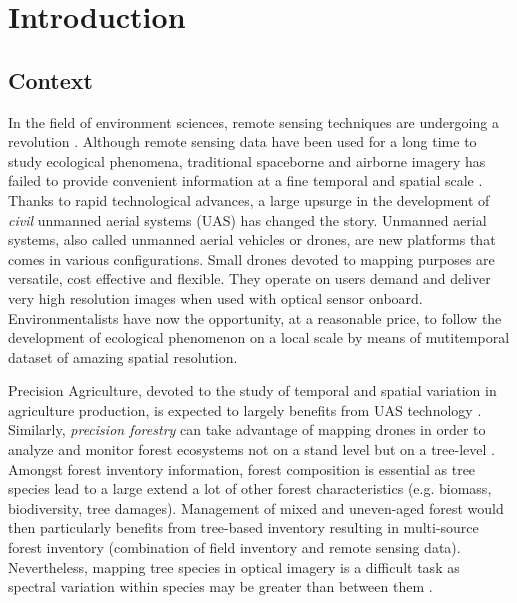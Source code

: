 \documentclass[remotesensing,article,submit,moreauthors,pdftex,12pt,a4paper]{mdpi} %
\begin{document}
\section{Introduction}

\subsection{Context}

In the field of environment sciences, remote sensing techniques are undergoing a revolution \cite{anderson_lightweight_2013}. 
Although remote sensing data have been used for a long time to study ecological phenomena, traditional spaceborne and airborne imagery has failed to provide convenient information at a fine temporal and spatial scale \cite{anderson_lightweight_2013}. 
Thanks to rapid technological advances, a large upsurge in the development of \textit{civil} unmanned aerial systems (UAS) has changed the story. 
Unmanned aerial systems, also called unmanned aerial vehicles or drones, are new platforms that comes in various configurations. 
Small drones devoted to mapping purposes are versatile, cost effective and flexible. 
They operate on users demand and deliver very high resolution images when used with optical sensor onboard. 
Environmentalists have now the opportunity, at a reasonable price, to follow the development of ecological phenomenon on a local scale by means of mutitemporal dataset of amazing spatial resolution.

Precision Agriculture, devoted to the study of temporal and spatial variation in agriculture production, is expected to largely benefits from UAS technology \cite{hunt_acquisition_2010}. 
Similarly, \textit{ precision forestry} can take advantage of mapping drones in order to analyze and monitor forest ecosystems not on a stand level but on a tree-level \cite{drauschke_towards_2014}. 
Amongst forest inventory information, forest composition is essential as tree species lead to a large extend a lot of other forest characteristics (e.g. biomass, biodiversity, tree damages). 
Management of mixed and uneven-aged forest would then particularly benefits from tree-based inventory resulting in multi-source forest inventory (combination of field inventory and remote sensing data).
Nevertheless, mapping tree species in optical imagery is a difficult task as spectral variation within species may be greater than between them \cite{key_comparison_2001,hill_mapping_2010, burkholder_seasonal_2011}.
\end{document}
